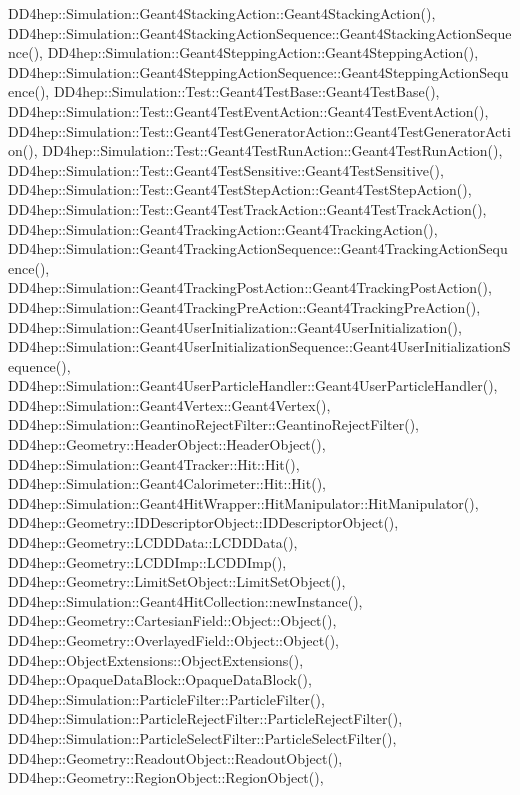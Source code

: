 D\+D4hep\+::\+Simulation\+::\+Geant4\+Stacking\+Action\+::\+Geant4\+Stacking\+Action(), D\+D4hep\+::\+Simulation\+::\+Geant4\+Stacking\+Action\+Sequence\+::\+Geant4\+Stacking\+Action\+Sequence(), D\+D4hep\+::\+Simulation\+::\+Geant4\+Stepping\+Action\+::\+Geant4\+Stepping\+Action(), D\+D4hep\+::\+Simulation\+::\+Geant4\+Stepping\+Action\+Sequence\+::\+Geant4\+Stepping\+Action\+Sequence(), D\+D4hep\+::\+Simulation\+::\+Test\+::\+Geant4\+Test\+Base\+::\+Geant4\+Test\+Base(), D\+D4hep\+::\+Simulation\+::\+Test\+::\+Geant4\+Test\+Event\+Action\+::\+Geant4\+Test\+Event\+Action(), D\+D4hep\+::\+Simulation\+::\+Test\+::\+Geant4\+Test\+Generator\+Action\+::\+Geant4\+Test\+Generator\+Action(), D\+D4hep\+::\+Simulation\+::\+Test\+::\+Geant4\+Test\+Run\+Action\+::\+Geant4\+Test\+Run\+Action(), D\+D4hep\+::\+Simulation\+::\+Test\+::\+Geant4\+Test\+Sensitive\+::\+Geant4\+Test\+Sensitive(), D\+D4hep\+::\+Simulation\+::\+Test\+::\+Geant4\+Test\+Step\+Action\+::\+Geant4\+Test\+Step\+Action(), D\+D4hep\+::\+Simulation\+::\+Test\+::\+Geant4\+Test\+Track\+Action\+::\+Geant4\+Test\+Track\+Action(), D\+D4hep\+::\+Simulation\+::\+Geant4\+Tracking\+Action\+::\+Geant4\+Tracking\+Action(), D\+D4hep\+::\+Simulation\+::\+Geant4\+Tracking\+Action\+Sequence\+::\+Geant4\+Tracking\+Action\+Sequence(), D\+D4hep\+::\+Simulation\+::\+Geant4\+Tracking\+Post\+Action\+::\+Geant4\+Tracking\+Post\+Action(), D\+D4hep\+::\+Simulation\+::\+Geant4\+Tracking\+Pre\+Action\+::\+Geant4\+Tracking\+Pre\+Action(), D\+D4hep\+::\+Simulation\+::\+Geant4\+User\+Initialization\+::\+Geant4\+User\+Initialization(), D\+D4hep\+::\+Simulation\+::\+Geant4\+User\+Initialization\+Sequence\+::\+Geant4\+User\+Initialization\+Sequence(), D\+D4hep\+::\+Simulation\+::\+Geant4\+User\+Particle\+Handler\+::\+Geant4\+User\+Particle\+Handler(), D\+D4hep\+::\+Simulation\+::\+Geant4\+Vertex\+::\+Geant4\+Vertex(), D\+D4hep\+::\+Simulation\+::\+Geantino\+Reject\+Filter\+::\+Geantino\+Reject\+Filter(), D\+D4hep\+::\+Geometry\+::\+Header\+Object\+::\+Header\+Object(), D\+D4hep\+::\+Simulation\+::\+Geant4\+Tracker\+::\+Hit\+::\+Hit(), D\+D4hep\+::\+Simulation\+::\+Geant4\+Calorimeter\+::\+Hit\+::\+Hit(), D\+D4hep\+::\+Simulation\+::\+Geant4\+Hit\+Wrapper\+::\+Hit\+Manipulator\+::\+Hit\+Manipulator(), D\+D4hep\+::\+Geometry\+::\+I\+D\+Descriptor\+Object\+::\+I\+D\+Descriptor\+Object(), D\+D4hep\+::\+Geometry\+::\+L\+C\+D\+D\+Data\+::\+L\+C\+D\+D\+Data(), D\+D4hep\+::\+Geometry\+::\+L\+C\+D\+D\+Imp\+::\+L\+C\+D\+D\+Imp(), D\+D4hep\+::\+Geometry\+::\+Limit\+Set\+Object\+::\+Limit\+Set\+Object(), D\+D4hep\+::\+Simulation\+::\+Geant4\+Hit\+Collection\+::new\+Instance(), D\+D4hep\+::\+Geometry\+::\+Cartesian\+Field\+::\+Object\+::\+Object(), D\+D4hep\+::\+Geometry\+::\+Overlayed\+Field\+::\+Object\+::\+Object(), D\+D4hep\+::\+Object\+Extensions\+::\+Object\+Extensions(), D\+D4hep\+::\+Opaque\+Data\+Block\+::\+Opaque\+Data\+Block(), D\+D4hep\+::\+Simulation\+::\+Particle\+Filter\+::\+Particle\+Filter(), D\+D4hep\+::\+Simulation\+::\+Particle\+Reject\+Filter\+::\+Particle\+Reject\+Filter(), D\+D4hep\+::\+Simulation\+::\+Particle\+Select\+Filter\+::\+Particle\+Select\+Filter(), D\+D4hep\+::\+Geometry\+::\+Readout\+Object\+::\+Readout\+Object(), D\+D4hep\+::\+Geometry\+::\+Region\+Object\+::\+Region\+Object(), 